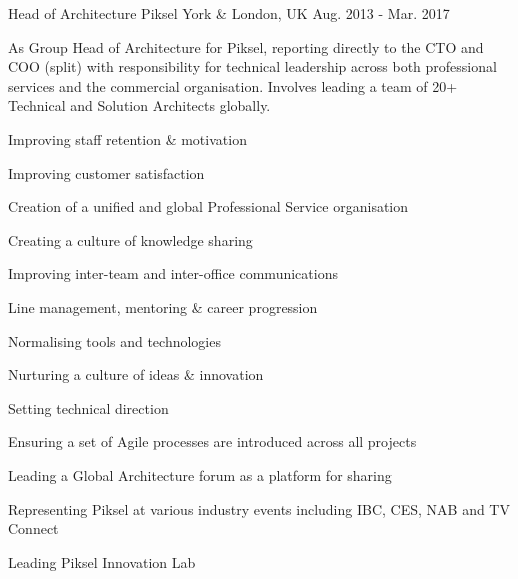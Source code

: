 \begin{cventries}

\cvexpentry
{Head of Architecture} %
{Piksel} %
{York \& London, UK} %
{Aug. 2013 - Mar. 2017} %
{
\begin{cvitemstitle}
\item {As Group Head of Architecture for Piksel, reporting directly to the CTO and COO (split) with responsibility for technical leadership across both professional services and the commercial organisation. Involves leading a team of 20+ Technical and Solution Architects globally.}
\end{cvitemstitle}
}
{ %
\begin{cvitems}
\item {Improving staff retention \& motivation}
\item {Improving customer satisfaction}
\item {Creation of a unified and global Professional Service organisation}
\item {Creating a culture of knowledge sharing}
\item {Improving inter-team and inter-office communications}
\item {Line management, mentoring \& career progression}
\item {Normalising tools and technologies}
\item {Nurturing a culture of ideas \& innovation}
\item {Setting technical direction}
\item {Ensuring a set of Agile processes are introduced across all projects}
\item {Leading a Global Architecture forum as a platform for sharing}
\item {Representing Piksel at various industry events including IBC, CES, NAB and TV Connect}
\item {Leading Piksel Innovation Lab}
\end{cvitems}
}



\end{cventries}

